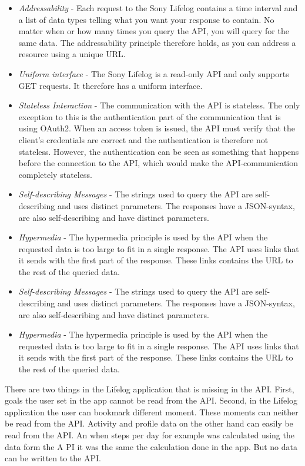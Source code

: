 \documentclass{cslthse-msc}
\begin{document}
\begin{itemize}
    \item \emph{Addressability} - Each request to the Sony Lifelog contains a time interval and a list of data types telling what you want your response to contain. No matter when or how many times you query the API, you will query for the same data. The addressability principle therefore holds, as you can address a resource using a unique URL. 
    \item \emph{Uniform interface} - The Sony Lifelog is a read-only API and only supports GET requests. It therefore has a uniform interface.
    \item \emph{Stateless Interaction} -  The communication with the API is stateless. The only exception to this is the authentication part of the communication that is using OAuth2. When an access token is issued, the API must verify that the client’s credentials are correct and the authentication is therefore not stateless. However, the authentication can be seen as something that happens before the connection to the API, which would make the API-communication completely stateless.
    \item \emph{Self-describing Messages} - The strings used to query the API are self-describing and uses distinct parameters. The responses have a JSON-syntax, are also self-describing and have distinct parameters. 
    \item \emph{Hypermedia} - The hypermedia principle is used by the API when the requested data is too large to fit in a single response. The API uses links that it sends with the first part of the response. These links contains the URL to the rest of the queried data.

    \item \emph{Self-describing Messages} - The strings used to query the API are self-describing and uses distinct parameters. The responses have a JSON-syntax, are also self-describing and have distinct parameters. 
    \item \emph{Hypermedia} - The hypermedia principle is used by the API when the requested data is too large to fit in a single response. The API uses links that it sends with the first part of the response. These links contains the URL to the rest of the queried data.
\end{itemize}
 
There are two things in the Lifelog application that is missing in the API. First, goals the user set in the app cannot be read from the API. Second, in the Lifelog application the user can bookmark different moment. These moments can neither be read from the API. Activity and profile data on the other hand can easily be read from the API. An when steps per day for example was calculated using the data form the A PI it was the same the calculation done in the app. But no data can be written to the API.
\end{document}
